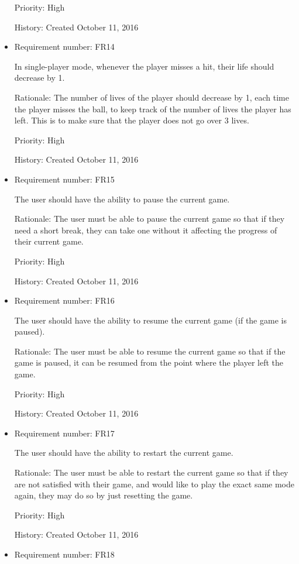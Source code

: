 \documentclass[12pt,letterpaper]{article}
\begin{document}
\begin{itemize}
		Priority: High

		History: Created October 11, 2016

		\item Requirement number: FR14

		In single-player mode, whenever the player misses a hit, their life should decrease by 1.

		Rationale: The number of lives of the player should decrease by 1, each time the player misses the ball, to keep track of the number of lives the player has left. This is to make sure that the player does not go over 3 lives.

		Priority: High

		History: Created October 11, 2016

		\item Requirement number: FR15

		The user should have the ability to pause the current game.

		Rationale: The user must be able to pause the current game so that if they need a short break, they can take one without it affecting the progress of their current game.

		Priority: High

		History: Created October 11, 2016

		\item Requirement number: FR16

		The user should have the ability to resume the current game (if the game is paused).

		Rationale: The user must be able to resume the current game so that if the game is paused, it can be resumed from the point where the player left the game.

		Priority: High
	
		History: Created October 11, 2016

		\item Requirement number: FR17

		The user should have the ability to restart the current game.

		Rationale: The user must be able to restart the current game so that if they are not satisfied with their game, and would like to play the exact same mode again, they may do so by just resetting the game.

		Priority: High

		History: Created October 11, 2016

		\item Requirement number: FR18


\end{itemize}
\end{document}
